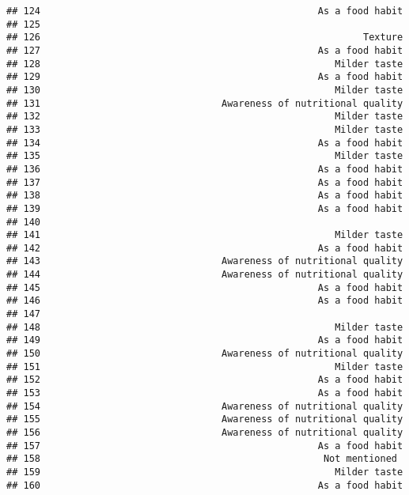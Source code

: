 \documentclass[
]{article}
\begin{document}
\begin{verbatim}
## 124                                                 As a food habit
## 125                                                                
## 126                                                         Texture
## 127                                                 As a food habit
## 128                                                    Milder taste
## 129                                                 As a food habit
## 130                                                    Milder taste
## 131                                Awareness of nutritional quality
## 132                                                    Milder taste
## 133                                                    Milder taste
## 134                                                 As a food habit
## 135                                                    Milder taste
## 136                                                 As a food habit
## 137                                                 As a food habit
## 138                                                 As a food habit
## 139                                                 As a food habit
## 140                                                                
## 141                                                    Milder taste
## 142                                                 As a food habit
## 143                                Awareness of nutritional quality
## 144                                Awareness of nutritional quality
## 145                                                 As a food habit
## 146                                                 As a food habit
## 147                                                                
## 148                                                    Milder taste
## 149                                                 As a food habit
## 150                                Awareness of nutritional quality
## 151                                                    Milder taste
## 152                                                 As a food habit
## 153                                                 As a food habit
## 154                                Awareness of nutritional quality
## 155                                Awareness of nutritional quality
## 156                                Awareness of nutritional quality
## 157                                                 As a food habit
## 158                                                  Not mentioned 
## 159                                                    Milder taste
## 160                                                 As a food habit

\end{verbatim}
\end{document}
